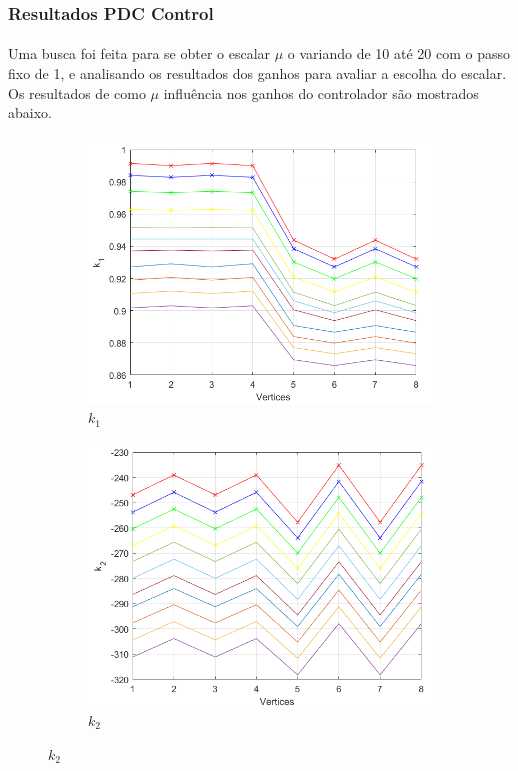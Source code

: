 \documentclass[a4paper,10pt]{article}
\begin{document}
\subsubsection{Resultados PDC Control}
\paragraph{}Uma busca foi feita para se obter o escalar $\mu$ o variando de 10 até 20 com o passo fixo de 1, e analisando os resultados dos ganhos para avaliar a escolha do escalar. Os resultados de como $\mu$ influência nos ganhos do controlador são mostrados abaixo.
\begin{figure}
	\centering
	\begin{subfigure}[b]{0.3\textwidth}
		\centering
		\includegraphics[scale=0.7]{fig/pdcmuk1}
		\caption{$k_1$}
	\end{subfigure}
	\hfill
	\begin{subfigure}[b]{0.45\textwidth}
		\centering
		\includegraphics[scale=0.7]{fig/pdcmuk2}
		\caption{$k_2$}
	\end{subfigure}
\end{figure}
\end{document}
